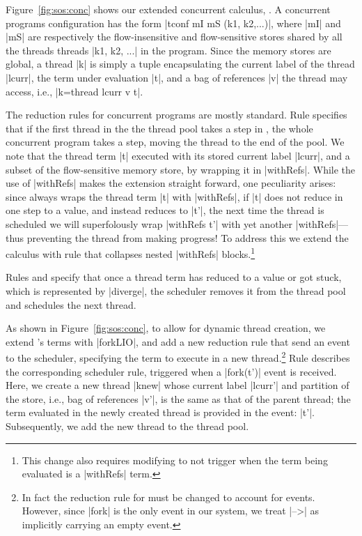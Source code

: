 Figure~\ref{fig:sos:conc} shows our extended concurrent calculus, \lioconc{}.
%
A concurrent programs configuration has the form |tconf mI mS (k1, k2,...)|,
where |mI| and |mS| are respectively the flow-insensitive and flow-sensitive
stores shared by all the threads threads |k1, k2, ...| in the program.
%
Since the memory stores are global, a thread |k| is simply a tuple
encapsulating the current label of the thread |lcurr|, the term under
evaluation |t|, and a bag of references |v| the thread may access, i.e.,
|k=thread lcurr v t|.

The reduction rules for concurrent programs are mostly standard.
%
Rule  specifies that if the first thread in the the thread pool
takes a step in \lioafs{}, the whole concurrent program takes a step, moving
the thread to the end of the pool.
%
We note that the thread term |t| executed with its stored current label
|lcurr|, and a subset of the flow-sensitive memory store, by wrapping it in
|withRefs|.
%
While the use of |withRefs| makes the extension straight forward, one
peculiarity arises: since  always wraps the thread term |t|
with |withRefs|, if |t| does not reduce in one step to a value, and instead
reduces to |t'|, the next time the thread is scheduled we will superfolously
wrap |withRefs t'| with yet another |withRefs|---thus preventing the thread
from making progress!
%
To address this we extend the calculus with rule  that
collapses nested |withRefs| blocks.\footnote{
This change also requires modifying  to not trigger when
the term being evaluated is a |withRefs| term.
}
 
Rules  and  specify that once a thread term
has reduced to a value or got stuck, which is represented by |diverge|, the
scheduler removes it from the thread pool and schedules the next thread.

%
As shown in Figure~\ref{fig:sos:conc}, to allow for dynamic thread creation, we
extend \lioafs{}'s terms with |forkLIO|, and add a new reduction rule that send
an event to the scheduler, specifying the term to execute in a new
thread.\footnote{
In fact the reduction rule for \lioafs{} must be changed to account for events.
However, since |fork| is the only event in our system, we treat |-->| as
implicitly carrying an empty event.
}
%
Rule  describes the corresponding scheduler rule, triggered
when a |fork(t')| event is received.
%
Here, we create a new thread |knew| whose current label |lcurr'| and partition
of the store, i.e., bag of references |v'|, is the same as that of the parent
thread; the term evaluated in the newly created thread is provided in the
event: |t'|.
%
Subsequently, we add the new thread to the thread pool.

